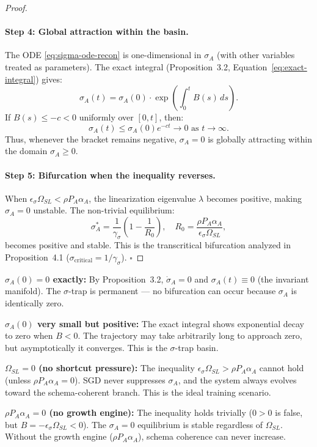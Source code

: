 \begin{proof}
\paragraph{Step 4: Global attraction within the basin.}
The ODE \eqref{eq:sigma-ode-recon} is one-dimensional in $\sigma_A$
(with other variables treated as parameters). The exact integral
(Proposition~3.2, Equation~\eqref{eq:exact-integral}) gives:
\[
\sigma_A(t) = \sigma_A(0) \cdot
\exp\!\left( \int_0^t B(s) \, ds \right).
\]
If $B(s) \leq -c < 0$ uniformly over $[0, t]$, then:
\[
\sigma_A(t) \leq \sigma_A(0) e^{-c t} \to 0 \text{ as } t \to \infty.
\]
Thus, whenever the bracket remains negative, $\sigma_A = 0$ is globally
attracting within the domain $\sigma_A \geq 0$.

\paragraph{Step 5: Bifurcation when the inequality reverses.}
When $\epsilon_\sigma \Omega_{SL} < \rho P_A \alpha_A$, the linearization
eigenvalue $\lambda$ becomes positive, making $\sigma_A = 0$ unstable.
The non-trivial equilibrium:
\[
\sigma_A^* = \frac{1}{\gamma_\sigma}\left(1 - \frac{1}{R_0}\right),
\quad R_0 = \frac{\rho P_A \alpha_A}{\epsilon_\sigma \Omega_{SL}},
\]
becomes positive and stable. This is the transcritical bifurcation
analyzed in Proposition~4.1 ($\sigma_{\text{critical}} = 1/\gamma_\sigma$).
$\square$
\end{proof}

\begin{boundary-case}
\textbf{$\sigma_A(0) = 0$ exactly:}
By Proposition~3.2, $\dot{\sigma}_A = 0$ and $\sigma_A(t) \equiv 0$
(the invariant manifold). The $\sigma$-trap is permanent — no
bifurcation can occur because $\sigma_A$ is identically zero.

\textbf{$\sigma_A(0)$ very small but positive:}
The exact integral shows exponential decay to zero when $B < 0$.
The trajectory may take arbitrarily long to approach zero, but
asymptotically it converges. This is the $\sigma$-trap basin.

\textbf{$\Omega_{SL} = 0$ (no shortcut pressure):}
The inequality $\epsilon_\sigma \Omega_{SL} > \rho P_A \alpha_A$
cannot hold (unless $\rho P_A \alpha_A = 0$). SGD never suppresses
$\sigma_A$, and the system always evolves toward the
schema-coherent branch. This is the ideal training scenario.

\textbf{$\rho P_A \alpha_A = 0$ (no growth engine):}
The inequality holds trivially ($0 > 0$ is false, but $B = -\epsilon_\sigma \Omega_{SL} < 0$).
The $\sigma_A = 0$ equilibrium is stable regardless of $\Omega_{SL}$.
Without the growth engine ($\rho P_A \alpha_A$), schema coherence can
never increase.
\end{boundary-case}

